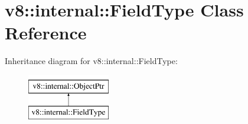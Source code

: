 \hypertarget{classv8_1_1internal_1_1FieldType}{}\section{v8\+:\+:internal\+:\+:Field\+Type Class Reference}
\label{classv8_1_1internal_1_1FieldType}
Inheritance diagram for v8\+:\+:internal\+:\+:Field\+Type\+:\begin{figure}[H]
\begin{center}
\leavevmode
\includegraphics[height=2.000000cm]{classv8_1_1internal_1_1FieldType}
\end{center}
\end{figure}
